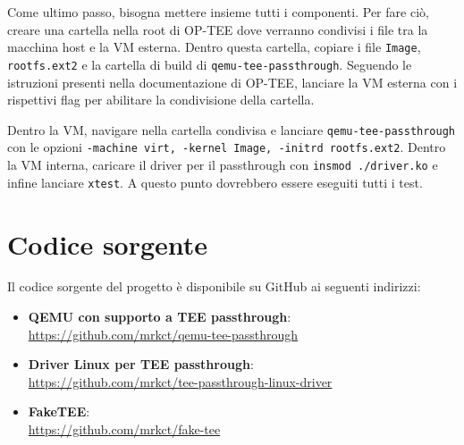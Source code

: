 \documentclass[12pt,italian]{report}
\begin{document}
\medbreak

Come ultimo passo, bisogna mettere insieme tutti i componenti.
Per fare ciò, creare una cartella nella root di OP-TEE dove verranno condivisi
i file tra la macchina host e la VM esterna.
Dentro questa cartella, copiare i file \texttt{Image}, \texttt{rootfs.ext2}
e la cartella di build di \texttt{qemu-tee-passthrough}.
Seguendo le istruzioni presenti nella documentazione di OP-TEE, lanciare
la VM esterna con i rispettivi flag per abilitare la condivisione della cartella.

\medbreak

Dentro la VM, navigare nella cartella condivisa e lanciare \texttt{qemu-tee-passthrough}
con le opzioni \texttt{-machine virt, -kernel Image, -initrd rootfs.ext2}.
Dentro la VM interna, caricare il driver per il passthrough con \texttt{insmod ./driver.ko}
e infine lanciare \texttt{xtest}.
A questo punto dovrebbero essere eseguiti tutti i test.

\chapter{Codice sorgente}
\label{app:codice-sorgente}
Il codice sorgente del progetto è disponibile su GitHub ai seguenti indirizzi:

\begin{itemize}
    \item 
        \textbf{QEMU con supporto a TEE passthrough}: \\
        \noindent 
        \url{https://github.com/mrkct/qemu-tee-passthrough}
    \item
        \textbf{Driver Linux per TEE passthrough}: \\ 
        \noindent
        \url{https://github.com/mrkct/tee-passthrough-linux-driver}
    \item
        \textbf{FakeTEE}: \\
        \noindent
        \url{https://github.com/mrkct/fake-tee}
\end{itemize}



\end{document}
